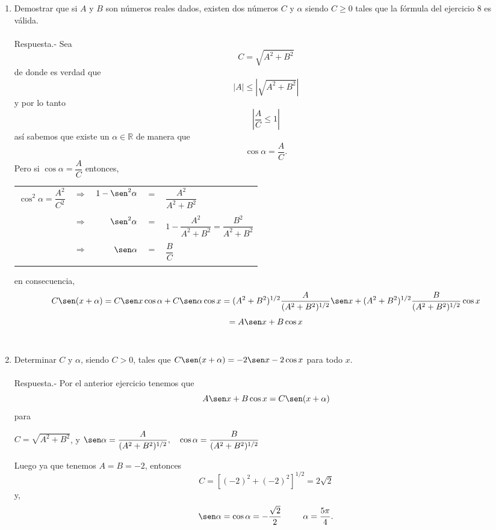 \begin{enumerate}
\item Demostrar que si $A$ y $B$ son números reales dados, existen dos números $C$ y $\alpha$ siendo $C\geq 0$ tales que la fórmula del ejercicio 8 es válida.\\\\
    Respuesta.-\; Sea $$C = \sqrt{A^2+B^2}$$
    de donde es verdad que $$|A|\leq \left|\sqrt{A^2+B^2}\right|$$
    y por lo tanto $$\left|\dfrac{A}{C}\leq 1\right|$$
    así sabemos que existe un $\alpha \in \mathbb{R}$ de manera que $$\cos \alpha = \dfrac{A}{C}.$$
    Pero si $\cos \alpha = \dfrac{A}{C}$ entonces,
    \begin{center}
	\begin{tabular}{rcrcl}
	    $\cos^2 \alpha = \dfrac{A^2}{C^2}$&$\Longrightarrow$&$1-\sen^2 \alpha$& $=$ & $\dfrac{A^2}{A^2+B^2}$\\\\
	  &$\Longrightarrow$& $\sen^2 \alpha $ & $=$ & $1-\dfrac{A^2}{A^2 + B^2} = \dfrac{B^2}{A^2+B^2}$\\\\
	  &$\Longrightarrow$& $\sen \alpha$ & $=$ & $\dfrac{B}{C}$\\\\
	\end{tabular}
    \end{center}
    en consecuencia,
    $$C\sen(x+\alpha) = C \sen x \cos \alpha + C \sen \alpha \cos x = (A^2+B^2)^{1/2} \dfrac{A}{(A^2+B^2)^{1/2}} \sen x + (A^2 + B^2)^{1/2} \dfrac{B}{(A^2+B^2)^{1/2}} \cos x  $$
    $$=A\sen x + B\cos x$$\\

\item Determinar $C$ y $ \alpha$, siendo $C>0$, tales que $C \sen (x+\alpha) = -2\sen x-2\cos x$ para todo $x$.\\\\
    Respuesta.-\; Por el anterior ejercicio tenemos que $$A\sen x + B\cos x = C \sen(x+\alpha)$$ para 
    \begin{center}
	$C=\sqrt{A^2+B^2}$, y $\sen \alpha = \dfrac{A}{(A^2+B^2)^{1/2}}, \quad \cos \alpha = \dfrac{B}{(A^2 + B^2)^{1/2}}$
    \end{center}
    Luego ya que tenemos $A=B=-2$, entonces
    $$C=\left[(-2)^2+(-2)^2\right]^{1/2} = 2\sqrt{2}$$
    y,
    $$\sen \alpha = \cos \alpha = -\dfrac{\sqrt{2}}{2} \; \qquad \; \alpha = \dfrac{5\pi}{4}.$$\\


\end{enumerate}
